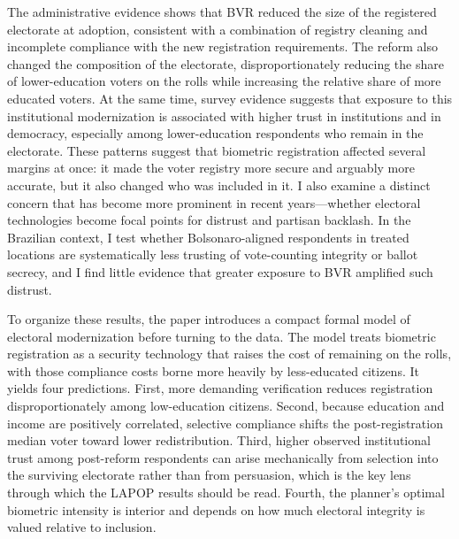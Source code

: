 The administrative evidence shows that BVR reduced the size of the registered electorate at adoption, consistent with a combination of registry cleaning and incomplete compliance with the new registration requirements. The reform also changed the composition of the electorate, disproportionately reducing the share of lower-education voters on the rolls while increasing the relative share of more educated voters. At the same time, survey evidence suggests that exposure to this institutional modernization is associated with higher trust in institutions and in democracy, especially among lower-education respondents who remain in the electorate. These patterns suggest that biometric registration affected several margins at once: it made the voter registry more secure and arguably more accurate, but it also changed who was included in it. I also examine a distinct concern that has become more prominent in recent years---whether electoral technologies become focal points for distrust and partisan backlash. In the Brazilian context, I test whether Bolsonaro-aligned respondents in treated locations are systematically less trusting of vote-counting integrity or ballot secrecy, and I find little evidence that greater exposure to BVR amplified such distrust.

To organize these results, the paper introduces a compact formal model of electoral modernization before turning to the data. The model treats biometric registration as a security technology that raises the cost of remaining on the rolls, with those compliance costs borne more heavily by less-educated citizens. It yields four predictions. First, more demanding verification reduces registration disproportionately among low-education citizens. Second, because education and income are positively correlated, selective compliance shifts the post-registration median voter toward lower redistribution. Third, higher observed institutional trust among post-reform respondents can arise mechanically from selection into the surviving electorate rather than from persuasion, which is the key lens through which the LAPOP results should be read. Fourth, the planner's optimal biometric intensity is interior and depends on how much electoral integrity is valued relative to inclusion.

